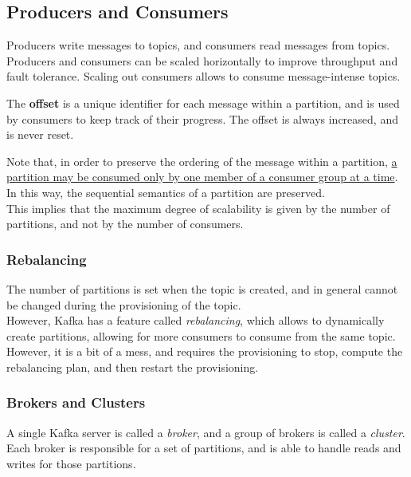 
\subsection{Producers and Consumers}

Producers write messages to topics, and consumers read messages from topics. Producers and consumers can be scaled horizontally to improve throughput and fault tolerance.
Scaling out consumers allows to consume message-intense topics. 

The \textbf{offset} is a unique identifier for each message within a partition, and is used by consumers to keep track of their progress. The offset is always increased, and is never reset.

Note that, in order to preserve the ordering of the message within a partition, \ul{a partition may be consumed only by one member of a consumer group at a time}.\\
In this way, the sequential semantics of a partition are preserved.\\
This implies that the maximum degree of scalability is given by the number of partitions, and not by the number of consumers.

\subsubsection{Rebalancing}
The number of partitions is set when the topic is created, and in general cannot be changed during the provisioning of the topic.\\
However, Kafka has a feature called \textit{rebalancing}, which allows to dynamically create partitions, allowing for more consumers to consume from the same topic.
However, it is a bit of a mess, and requires the provisioning to stop, compute the rebalancing plan, and then restart the provisioning.

\subsubsection{Brokers and Clusters}
A single Kafka server is called a \textit{broker}, and a group of brokers is called a \textit{cluster}. Each broker is responsible for a set of partitions, and is able to handle reads and writes for those partitions.

